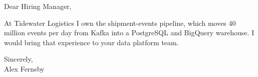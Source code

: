 \documentclass[11pt]{article}
\begin{document}
Dear Hiring Manager,

At Tidewater Logistics I own the shipment-events pipeline, which moves 40 million events per day from Kafka into a
PostgreSQL and BigQuery warehouse. I would bring that experience to your data platform team.

Sincerely,\\
Alex Fernsby
\end{document}
